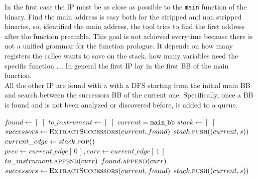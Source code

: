 In the first case the \gls{IP} must be as close as possible to the \texttt{main} function of the binary.
Find the main address is easy both for the stripped and non stripped binaries, so, identified the main address, 
the tool tries to find the first address after the function preamble.
This goal is not achieved everytime because there is not a unified grammar for the function prologue. 
It depends on how many registers the callee wants to save on the stack, how many variables need the specific function \dots.
In general the first \gls{IP} lay in the first \gls{BB} of the main function.\\
All the other \gls{IP} are found with a with a \gls{DFS} starting from the initial main \gls{BB} and search between the 
successors \gls{BB} of the current one.
Specifically, once a \gls{BB} is found and is not been analyzed or discovered before, is added to a queue.
\begin{algorithm}[ht]
    \caption{Instrumentation point search with DFS algorithm}
    \label{alg:ip_search_dfs}
    \begin{algorithmic}[1]
        \STATE $found \gets[\,\,]$ \COMMENT {\small \textcolor{green!60!black}{found is a list of discovered basic blocks. It contains both the basic blocks to be instrumented and the basic block for which an instrumentation is not required}}
        \STATE $to\_instrument\gets[\,\,]$ \COMMENT{\small \textcolor{green!60!black}{this is the list of basic blocks to be instrumented. Is a subset of ``found'' list}}
        \STATE $current=\texttt{main\_bb}$
        \STATE $stack\gets[\,\,]$
        \STATE $successors\gets \textsc{ExtractSuccessors}(current,found)$
            \STATE $stack.\textsc{push}((current,s))$
        \ENDFOR
            \STATE $current\_edge\gets stack.\textsc{pop}()$
            \STATE $prev \gets current\_edge[\,0\,] , curr \gets current\_edge[\,1\,]$
                \STATE $to\_instrument.\textsc{append}(curr)$  \COMMENT{\small \textcolor{green!60!black}{If the previous basic block ends with a call instruction, the current basic block is not instrumented}}
            \ENDIF
            \STATE $found.\textsc{append}(curr)$
            \STATE $successors\gets \textsc{ExtractSuccessors}(current,found)$
                \STATE $stack.\textsc{push}((current,s))$ 
            \ENDFOR
        \ENDWHILE
    \end{algorithmic}
\end{algorithm}
